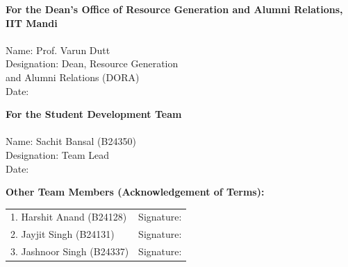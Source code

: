 \documentclass[11pt]{article}
\begin{document}
\vspace{1cm}
\begin{minipage}[t]{0.48\textwidth}
\textbf{For the Dean's Office of Resource Generation and Alumni Relations, IIT Mandi}\\[1.4cm]
\underline{\hspace{6.5cm}}\\
Name: Prof. Varun Dutt\\[6pt]
Designation: Dean, Resource Generation\\ and Alumni Relations (DORA)\\[6pt]
Date:\underline{\hspace{5.5cm}}
\end{minipage}
\hfill
\begin{minipage}[t]{0.48\textwidth}
\textbf{For the Student Development Team}\\[6pt]
\underline{\hspace{6.5cm}}\\
Name: Sachit Bansal (B24350)\\
Designation: Team Lead\\
Date:\underline{\hspace{5.5cm}}
\end{minipage}

\vspace{1cm}
\textbf{Other Team Members (Acknowledgement of Terms):}

\begin{tabular}{@{}p{7.5cm}p{6cm}@{}}
1. Harshit Anand (B24128) & Signature: \underline{\hspace{3.5cm}} \\[10pt]
2. Jayjit Singh (B24131) & Signature: \underline{\hspace{3.5cm}} \\[10pt]
3. Jashnoor Singh (B24337) & Signature: \underline{\hspace{3.5cm}} \\
\end{tabular}
\end{document}
